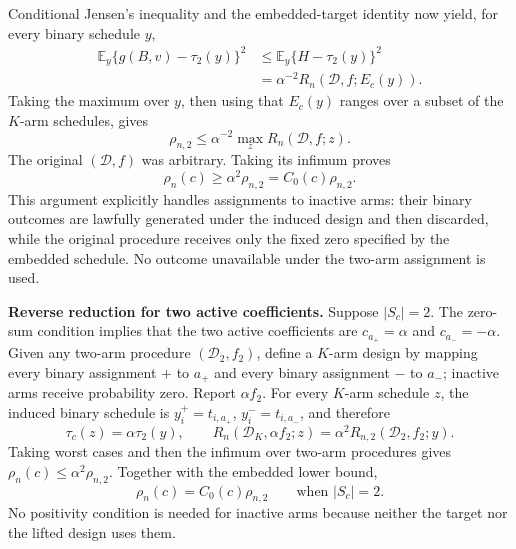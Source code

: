 Conditional Jensen's inequality and the embedded-target identity now yield, for every binary schedule \(y\),
\[
 \begin{aligned}
 \mathbb E_y\{g(B,v)-\tau_2(y)\}^2
 &\leq \mathbb E_y\{H-\tau_2(y)\}^2\\
 &=\alpha^{-2}
 R_n(\mathcal D,f;E_c(y)).
 \end{aligned}
\]
Taking the maximum over \(y\), then using that \(E_c(y)\) ranges over a subset of the \(K\)-arm schedules, gives
\[
 \rho_{n,2}
 \leq\alpha^{-2}\max_z R_n(\mathcal D,f;z).
\]
The original \((\mathcal D,f)\) was arbitrary. Taking its infimum proves
\[
 \rho_n(c)\geq\alpha^2\rho_{n,2}=C_0(c)\rho_{n,2}.
\]
This argument explicitly handles assignments to inactive arms: their binary outcomes are lawfully generated under the induced design and then discarded, while the original procedure receives only the fixed zero specified by the embedded schedule. No outcome unavailable under the two-arm assignment is used.

\textbf{Reverse reduction for two active coefficients.}
Suppose \(|S_c|=2\). The zero-sum condition implies that the two active coefficients are \(c_{a_+}=\alpha\) and \(c_{a_-}=-\alpha\). Given any two-arm procedure \((\mathcal D_2,f_2)\), define a \(K\)-arm design by mapping every binary assignment \(+\) to \(a_+\) and every binary assignment \(-\) to \(a_-\); inactive arms receive probability zero. Report \(\alpha f_2\). For every \(K\)-arm schedule \(z\), the induced binary schedule is \(y_i^+=t_{i,a_+}\), \(y_i^-=t_{i,a_-}\), and therefore
\[
 \tau_c(z)=\alpha\tau_2(y),
 \qquad
 R_n(\mathcal D_K,\alpha f_2;z)
 =\alpha^2R_{n,2}(\mathcal D_2,f_2;y).
\]
Taking worst cases and then the infimum over two-arm procedures gives
\(\rho_n(c)\leq\alpha^2\rho_{n,2}\). Together with the embedded lower bound,
\[
 \rho_n(c)=C_0(c)\rho_{n,2}\qquad\text{when }|S_c|=2.
\]
No positivity condition is needed for inactive arms because neither the target nor the lifted design uses them.

